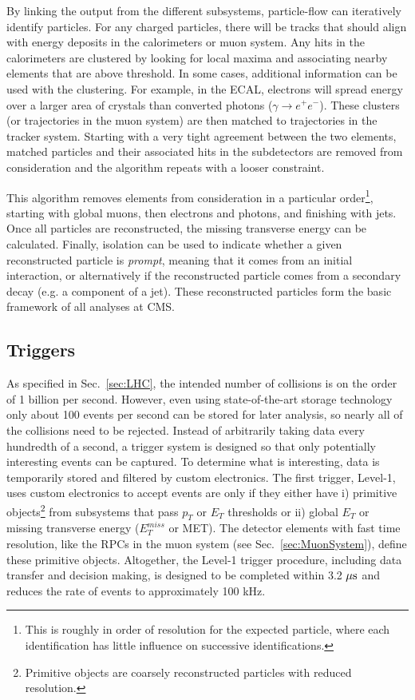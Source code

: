 By linking the output from the different subsystems, particle-flow can iteratively identify particles. For any charged particles, there will be tracks that should align with energy deposits in the calorimeters or muon system. Any hits in the calorimeters are clustered by looking for local maxima and associating nearby elements that are above threshold. In some cases, additional information can be used with the clustering. For example, in the ECAL, electrons will spread energy over a larger area of crystals than converted photons ($\gamma\rightarrow e^{+}e^{-}$). These clusters (or trajectories in the muon system) are then matched to trajectories in the tracker system. Starting with a very tight agreement between the two elements, matched particles and their associated hits in the subdetectors are removed from consideration and the algorithm repeats with a looser constraint.

This algorithm removes elements from consideration in a particular order\footnote{This is roughly in order of resolution for the expected particle, where each identification has little influence on successive identifications.}, starting with global muons, then electrons and photons, and finishing with jets. Once all particles are reconstructed, the missing transverse energy can be calculated. Finally, isolation can be used to indicate whether a given reconstructed particle is \textit{prompt}, meaning that it comes from an initial interaction, or alternatively if the reconstructed particle comes from a secondary decay (e.g. a component of a jet). These reconstructed particles form the basic framework of all analyses at CMS. 

\subsection{Triggers}
\label{sec:Triggers}

As specified in Sec.~\ref{sec:LHC}, the intended number of collisions is on the order of 1 billion per second. However, even using state-of-the-art storage technology only about 100 events per second can be stored for later analysis, so nearly all of the collisions need to be rejected. Instead of arbitrarily taking data every hundredth of a second, a trigger system is designed so that only potentially interesting events can be captured. To determine what is interesting, data is temporarily stored and filtered by custom electronics. The first trigger, Level-1, uses custom electronics to accept events are only if they either have i) primitive objects\footnote{Primitive objects are coarsely reconstructed particles with reduced resolution.} from subsystems that pass $p_T$ or $E_T$ thresholds or ii) global $E_T$ or missing transverse energy ($E_T^{miss}$ or MET). The detector elements with fast time resolution, like the RPCs in the muon system (see Sec.~\ref{sec:MuonSystem}), define these primitive objects. Altogether, the Level-1 trigger procedure, including data transfer and decision making, is designed to be completed within 3.2 $\mu\rm{s}$ and reduces the rate of events to approximately 100 kHz.

